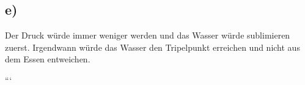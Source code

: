 

\subsection*{e)}

Der Druck würde immer weniger werden und das Wasser würde sublimieren zuerst. Irgendwann würde das Wasser den Tripelpunkt erreichen und nicht aus dem Essen entweichen.

```